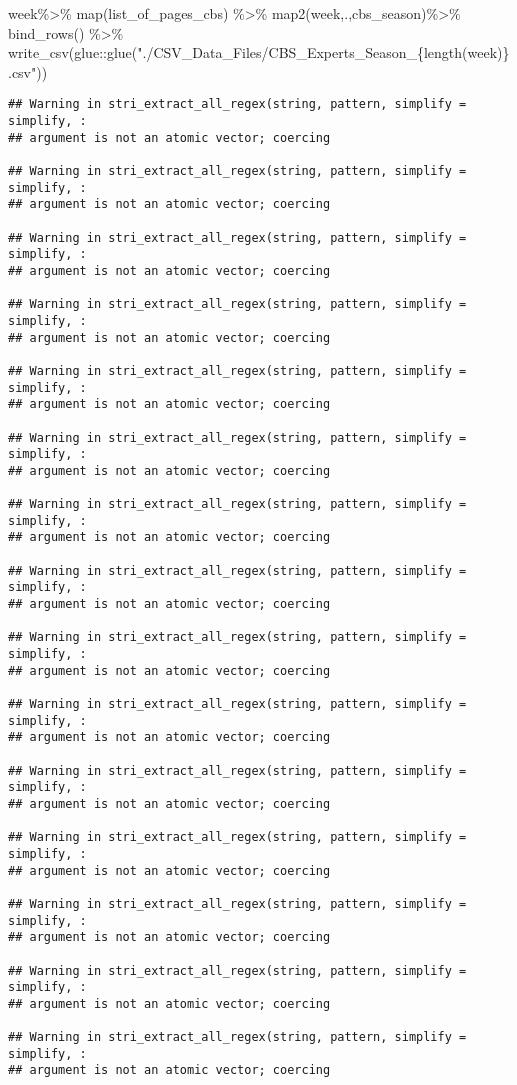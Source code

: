 \documentclass[
]{article}
\newenvironment{Shaded}{\begin{snugshade}}{\end{snugshade}}
\newcommand{\FunctionTok}[1]{\textcolor[rgb]{0.00,0.00,0.00}{#1}}
\newcommand{\NormalTok}[1]{#1}
\newcommand{\SpecialCharTok}[1]{\textcolor[rgb]{0.00,0.00,0.00}{#1}}
\newcommand{\StringTok}[1]{\textcolor[rgb]{0.31,0.60,0.02}{#1}}
\begin{document}
\begin{Shaded}
\begin{Highlighting}[]
\NormalTok{week}\SpecialCharTok{\%\textgreater{}\%}
  \FunctionTok{map}\NormalTok{(list\_of\_pages\_cbs) }\SpecialCharTok{\%\textgreater{}\%} 
  \FunctionTok{map2}\NormalTok{(week,.,cbs\_season)}\SpecialCharTok{\%\textgreater{}\%}
  \FunctionTok{bind\_rows}\NormalTok{() }\SpecialCharTok{\%\textgreater{}\%} 
  \FunctionTok{write\_csv}\NormalTok{(glue}\SpecialCharTok{::}\FunctionTok{glue}\NormalTok{(}\StringTok{"./CSV\_Data\_Files/CBS\_Experts\_Season\_\{length(week)\}.csv"}\NormalTok{))}
\end{Highlighting}
\end{Shaded}

\begin{verbatim}
## Warning in stri_extract_all_regex(string, pattern, simplify = simplify, :
## argument is not an atomic vector; coercing

## Warning in stri_extract_all_regex(string, pattern, simplify = simplify, :
## argument is not an atomic vector; coercing

## Warning in stri_extract_all_regex(string, pattern, simplify = simplify, :
## argument is not an atomic vector; coercing

## Warning in stri_extract_all_regex(string, pattern, simplify = simplify, :
## argument is not an atomic vector; coercing

## Warning in stri_extract_all_regex(string, pattern, simplify = simplify, :
## argument is not an atomic vector; coercing

## Warning in stri_extract_all_regex(string, pattern, simplify = simplify, :
## argument is not an atomic vector; coercing

## Warning in stri_extract_all_regex(string, pattern, simplify = simplify, :
## argument is not an atomic vector; coercing

## Warning in stri_extract_all_regex(string, pattern, simplify = simplify, :
## argument is not an atomic vector; coercing

## Warning in stri_extract_all_regex(string, pattern, simplify = simplify, :
## argument is not an atomic vector; coercing

## Warning in stri_extract_all_regex(string, pattern, simplify = simplify, :
## argument is not an atomic vector; coercing

## Warning in stri_extract_all_regex(string, pattern, simplify = simplify, :
## argument is not an atomic vector; coercing

## Warning in stri_extract_all_regex(string, pattern, simplify = simplify, :
## argument is not an atomic vector; coercing

## Warning in stri_extract_all_regex(string, pattern, simplify = simplify, :
## argument is not an atomic vector; coercing

## Warning in stri_extract_all_regex(string, pattern, simplify = simplify, :
## argument is not an atomic vector; coercing

## Warning in stri_extract_all_regex(string, pattern, simplify = simplify, :
## argument is not an atomic vector; coercing
\end{verbatim}
\end{document}
